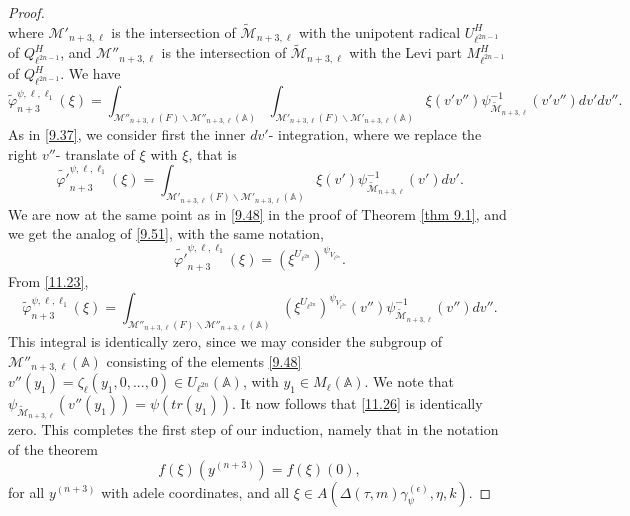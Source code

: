 \documentclass[12pts]{amsart}
\newcommand{\BA}{{\mathbb {A}}}
\begin{document}
\begin{proof}
\begin{equation}
 \end{equation}
 where $\mathcal{M}'_{n+3,\ell}$ is the intersection of $\tilde{\mathcal{M}}_{n+3,\ell}$ with the unipotent radical $U^H_{\ell^{2n-1}}$ of $Q^H_{\ell^{2n-1}}$, and $\mathcal{M}''_{n+3,\ell}$ is the intersection of $\tilde{\mathcal{M}}_{n+3,\ell}$ with the Levi part $M^H_{\ell^{2n-1}}$ of $Q^H_{\ell^{2n-1}}$. We have
 \begin{equation}\label{11.23}
 \tilde{\varphi}_{n+3}^{\psi,\ell,\ell_1}(\xi)=
 \int_{\mathcal{M}''_{n+3,\ell}(F)\backslash
 	\mathcal{M}''_{n+3,\ell}(\BA)}\int_{\mathcal{M}'_{n+3,\ell}(F)\backslash
 	\mathcal{M}'_{n+3,\ell}(\BA)}\xi(v'v'')\psi^{-1}_{\tilde{\mathcal{M}}_{n+3,\ell}}(v'v'')dv'dv''. 
 \end{equation}
 As in \eqref{9.37}, we consider first the inner $dv'$- integration, where we replace the right $v''$- translate of $\xi$ with $\xi$, that is
 \begin{equation}\label{11.24}
  \tilde{\varphi'}_{n+3}^{\psi,\ell,\ell_1}(\xi)=
 \int_{\mathcal{M}'_{n+3,\ell}(F)\backslash
 	\mathcal{M}'_{n+3,\ell}(\BA)}\xi(v')\psi^{-1}_{\tilde{\mathcal{M}}_{n+3,\ell}}(v')dv'. 
 \end{equation}
 We are now at the same point as in \eqref{9.48} in the proof of Theorem \ref{thm 9.1}, and we get the analog of \eqref{9.51}, with the same notation,
 \begin{equation}\label{11.25}
 \tilde{\varphi'}_{n+3}^{\psi,\ell,\ell_1}(\xi)=(\xi^{U_{\ell^{2n}}})^{\psi_{V_{\ell^{2n}}}}.
\end{equation}
From \eqref{11.23}, 
\begin{equation}\label{11.26}
\tilde{\varphi}_{n+3}^{\psi,\ell,\ell_1}(\xi)=
\int_{\mathcal{M}''_{n+3,\ell}(F)\backslash
	\mathcal{M}''_{n+3,\ell}(\BA)}(\xi^{U_{\ell^{2n}}})^{\psi_{V_{\ell^{2n}}}}(v'')
\psi^{-1}_{\tilde{\mathcal{M}}_{n+3,\ell}}(v'')dv''.
\end{equation}
This integral is identically zero, since we may consider the subgroup of $\mathcal{M}''_{n+3,\ell}(\BA)$ consisting of the elements \eqref{9.48} $v''(y_1)=\zeta_\ell(y_1,0,...,0)\in U_{\ell^{2n}}(\BA)$, with $y_1\in M_\ell(\BA)$. We note that $\psi_{\tilde{\mathcal{M}}_{n+3,\ell}}(v''(y_1))=\psi(tr(y_1))$. It now follows that \eqref{11.26} is identically zero. This completes the first step of our induction, namely that in the notation of the theorem
\begin{equation}\label{11.27}
f(\xi)(y^{(n+3)})=f(\xi)(0),
\end{equation} 
 for all $y^{(n+3)}$ with adele coordinates, and all $\xi\in A(\Delta(\tau,m)\gamma_\psi^{(\epsilon)},\eta,k)$.
 

\end{proof}
\end{document}
